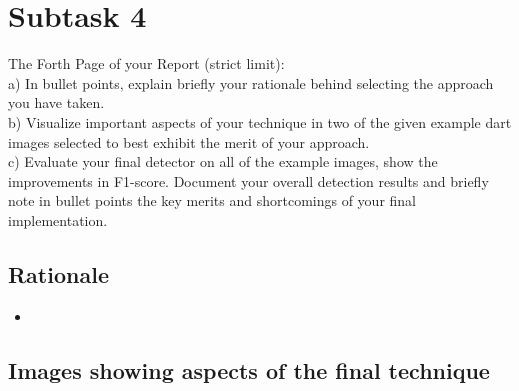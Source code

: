 \documentclass[conference]{IEEEtran}
\begin{document}
\newpage
\section{Subtask 4}



The Forth Page of your Report (strict limit):\\
a) In bullet points, explain briefly your rationale behind
selecting the approach you have taken.\\
b) Visualize important aspects of your technique in two of
the given example dart images selected to best exhibit the
merit of your approach.\\
c) Evaluate your final detector on all of the example images,
show the improvements in F1-score. Document your
overall detection results and briefly note in bullet points
the key merits and shortcomings of your final
implementation.

\subsection{Rationale}
\begin{itemize}
	\item 
\end{itemize}

\subsection{Images showing aspects of the final technique}
\end{document}
